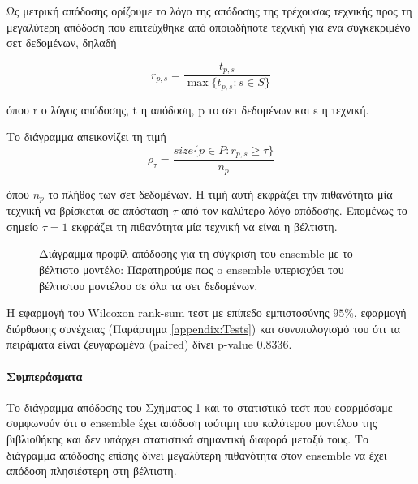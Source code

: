 Ως μετρική απόδοσης ορίζουμε το λόγο της απόδοσης της τρέχουσας τεχνικής προς τη μεγαλύτερη απόδοση που επιτεύχθηκε από οποιαδήποτε τεχνική για ένα συγκεκριμένο σετ δεδομένων, δηλαδή

\begin{equation}
r_{p,s}= \frac{t_{p,s}}{\max\{{t_{p,s} : s \in S}\}}    
\end{equation} 

όπου r ο λόγος απόδοσης, t η απόδοση, p το σετ δεδομένων και s η τεχνική.

Το διάγραμμα απεικονίζει τη τιμή
\begin{equation}
\rho_{\tau}= \frac{size\{{p \in P : r_{p,s} \geq \tau  }\}}{n_p}   
\end{equation}

όπου $n_p$ το πλήθος των σετ δεδομένων. Η τιμή αυτή εκφράζει την πιθανότητα μία τεχνική να βρίσκεται σε απόσταση $\tau$ από τον καλύτερο λόγο απόδοσης.  Επομένως το σημείο $\tau = 1$ εκφράζει τη πιθανότητα μία τεχνική να είναι η βέλτιστη.

\begin{figure}[!htb]
	\scalebox{0.8}{
	}
		\caption[Διάγραμμα προφίλ απόδοσης για τη σύγκριση του ensemble με το βέλτιστο μοντέλο]{Διάγραμμα προφίλ απόδοσης για τη σύγκριση του ensemble με το βέλτιστο μοντέλο: Παρατηρούμε πως o ensemble υπερισχύει του βέλτιστου μοντέλου σε όλα τα σετ δεδομένων. }
		\label{fig:ensprof}
\end{figure}

Η εφαρμογή του Wilcoxon rank-sum τεστ με επίπεδο εμπιστοσύνης $95\%$, εφαρμογή διόρθωσης συνέχειας (Παράρτημα \ref{appendix:Tests}) και συνυπολογισμό του ότι τα πειράματα είναι ζευγαρωμένα (paired) δίνει p-value 0.8336.  

\paragraph{Συμπεράσματα}
Το διάγραμμα απόδοσης του Σχήματος \ref{fig:ensprof} και το στατιστικό τεστ που εφαρμόσαμε συμφωνούν ότι ο ensemble έχει απόδοση ισότιμη του καλύτερου μοντέλου της βιβλιοθήκης και δεν υπάρχει στατιστικά σημαντική διαφορά μεταξύ τους. Το διάγραμμα απόδοσης επίσης δίνει μεγαλύτερη πιθανότητα στον ensemble να έχει απόδοση πλησιέστερη στη βέλτιστη.
 
